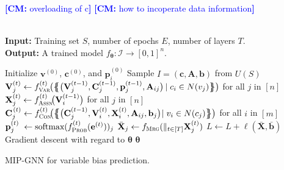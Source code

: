 \documentclass[11pt, DIV=12]{scrartcl}
\theoremstyle{definition}
\newcommand{\cI}{\ensuremath{{\mathcal I}}\xspace}
\renewcommand{\vec}[1]{\mathbf{#1}}
\newcommand{\cm}[1]{{{\textcolor{blue}{\textbf{[CM:} {#1}\textbf{]}}}}}
\begin{document}
\cm{overloading of c}
\cm{how to incoperate data information}


\begin{algorithm}[H]\mbox{\hfill}
	\\\textbf{Input:}  Training set $S$, number of epochs $E$, number of layers $T$.  \\
	\textbf{Output:} A trained model $f_{\boldsymbol{\theta}} \colon \cI \to [0,1]^n$.
	\begin{algorithmic}[1]
		\State Initialize $\vec{v}^{(0)}$, $\vec{c}^{(0)}$, and $\vec{p}_i^{(0)}$
		\Statex
		\State Sample $I = (\vec{c}, \vec{A}, \vec{b})$ from $U(S)$ 
		\State $\vec{V}_j^{(t)} \leftarrow f_{\textsc{Var}}^{(t)} \hspace{-1pt} \big( \big\{ \hspace{-4.4pt} \big\{ \big( \vec{V}^{(t-1)}_j, \vec{C}^{(t-1)}_j, \vec{p}^{(t-1)}_j, \vec{A}_{ij} \big)\hspace{-1pt} \mid c_i \in N(v_j) \big\} \hspace{-4.4pt} \big\} \big)$ for all $j$ in $[n]$ 		
		\State $\vec{X}_j^{(t)} \leftarrow f_\textsc{Assn}^{(t)} \hspace{-2pt} \big(\vec{V}_i^{(t-1)} \big)$ for all $j$ in $[n]$ 
		\Statex
		\State $\vec{C}_j^{\hspace{1pt}(t)} \leftarrow f_\textsc{Con}^{(t)} \hspace{-2pt} \big( \big\{ \hspace{-4.4pt} \big\{ \big( \vec{C}^{(t-1)}_j, \vec{V}^{(t)}_i, \vec{X}^{(t)}_i, \vec{A}_{ij}, \vec{b}_j \big)\hspace{-2pt} \mid v_i \in N(c_j) \big\} \hspace{-4.4pt} \big\} \big)$ for all $i$ in $[m]$ 	
		\State $\vec{p}_{j}^{(t)} \hspace{3pt}\leftarrow \text{softmax}(f_\textsc{Prob}^{(t)}(\vec{e}^{(t)}))_{j}$
		\EndFor
		\State $\bar{\vec{X}}_j \leftarrow f_\textsc{Mrg}(\mathbin\Vert_{t \in [T]} \vec{X}_j^{(t)})$
		\State $L \leftarrow L + \ell(\vec{\bar{X}}, \vec{\bar b})$ 
		\State Gradient descent  with regard to $\boldsymbol{\theta}$
		\EndFor
		\State \Return $\boldsymbol{\theta}$
		
	\end{algorithmic}
	\caption{MIP-GNN for variable bias prediction.}
	\label{alg:as2}
\end{algorithm}
\end{document}
